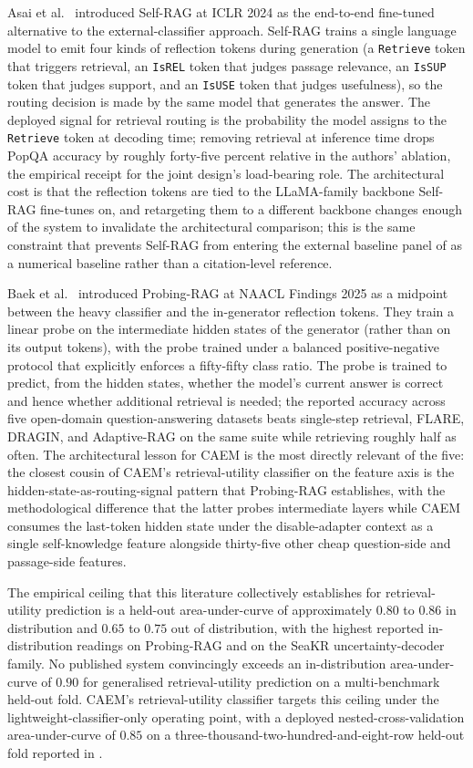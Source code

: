 Asai et al.~\cite{asai2024selfrag} introduced Self-RAG at ICLR 2024 as the end-to-end fine-tuned alternative to the external-classifier approach. Self-RAG trains a single language model to emit four kinds of reflection tokens during generation (a \texttt{Retrieve} token that triggers retrieval, an \texttt{IsREL} token that judges passage relevance, an \texttt{IsSUP} token that judges support, and an \texttt{IsUSE} token that judges usefulness), so the routing decision is made by the same model that generates the answer. The deployed signal for retrieval routing is the probability the model assigns to the \texttt{Retrieve} token at decoding time; removing retrieval at inference time drops PopQA accuracy by roughly forty-five percent relative in the authors' ablation, the empirical receipt for the joint design's load-bearing role. The architectural cost is that the reflection tokens are tied to the LLaMA-family backbone Self-RAG fine-tunes on, and retargeting them to a different backbone changes enough of the system to invalidate the architectural comparison; this is the same constraint that prevents Self-RAG from entering the external baseline panel of  as a numerical baseline rather than a citation-level reference.

Baek et al.~\cite{baek2025probing} introduced Probing-RAG at NAACL Findings 2025 as a midpoint between the heavy classifier and the in-generator reflection tokens. They train a linear probe on the intermediate hidden states of the generator (rather than on its output tokens), with the probe trained under a balanced positive-negative protocol that explicitly enforces a fifty-fifty class ratio. The probe is trained to predict, from the hidden states, whether the model's current answer is correct and hence whether additional retrieval is needed; the reported accuracy across five open-domain question-answering datasets beats single-step retrieval, FLARE, DRAGIN, and Adaptive-RAG on the same suite while retrieving roughly half as often. The architectural lesson for CAEM is the most directly relevant of the five: the closest cousin of CAEM's retrieval-utility classifier on the feature axis is the hidden-state-as-routing-signal pattern that Probing-RAG establishes, with the methodological difference that the latter probes intermediate layers while CAEM consumes the last-token hidden state under the disable-adapter context as a single self-knowledge feature alongside thirty-five other cheap question-side and passage-side features.

The empirical ceiling that this literature collectively establishes for retrieval-utility prediction is a held-out area-under-curve of approximately $0.80$ to $0.86$ in distribution and $0.65$ to $0.75$ out of distribution, with the highest reported in-distribution readings on Probing-RAG and on the SeaKR uncertainty-decoder family. No published system convincingly exceeds an in-distribution area-under-curve of $0.90$ for generalised retrieval-utility prediction on a multi-benchmark held-out fold. CAEM's retrieval-utility classifier targets this ceiling under the lightweight-classifier-only operating point, with a deployed nested-cross-validation area-under-curve of $0.85$ on a three-thousand-two-hundred-and-eight-row held-out fold reported in .

